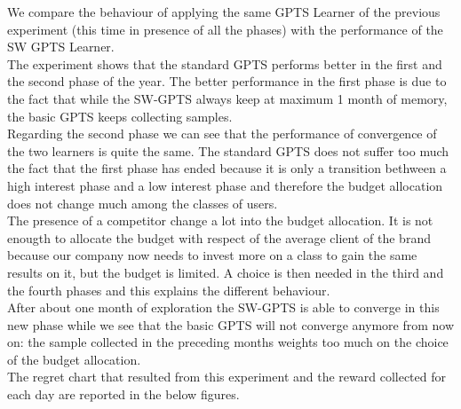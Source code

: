 We compare the behaviour of applying the same GPTS Learner of the previous experiment (this time in presence of all the phases) with the performance of the SW GPTS Learner.
\\The experiment shows that the standard GPTS performs better in the first and the second phase of the year.  The better performance in the first phase is due to the fact that while the SW-GPTS always keep at maximum 1 month of memory, the basic GPTS keeps collecting samples. 
\\Regarding the second phase we can see that the performance of convergence of the two learners is quite the same. The standard GPTS does not suffer too much the fact that the first phase has ended because it is only a transition bethween a high interest phase and a low interest phase and therefore the budget allocation does not change much among the classes of users.
\\The presence of a competitor change a lot into the budget allocation. It is not enougth to allocate the budget with respect of the average client of the brand because our company now needs to invest more on a class to gain the same results on it, but the budget is limited. A choice is then needed in the third and the fourth phases and this explains the different behaviour. 
\\After about one month of exploration the SW-GPTS is able to converge in this new phase while we see that the basic GPTS will not converge anymore from now on: the sample collected in the preceding months weights too much on the choice of the budget allocation.
\\The regret chart that resulted from this experiment and the reward collected for each day are reported in the below figures.\\
